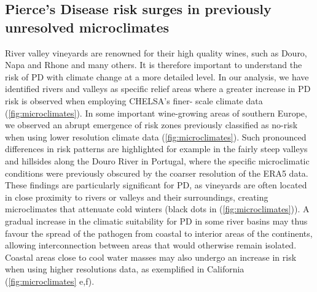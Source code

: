 \subsection{Pierce's Disease risk surges in previously unresolved
    microclimates}

River valley vineyards are renowned  for their high quality wines, such as
Douro, Napa and Rhone and many others. It is therefore important to understand
the risk of  PD with climate change at	a more detailed level. In our analysis,
we have identified rivers and valleys as specific relief areas where a greater
increase in PD risk is observed when employing CHELSA’s finer- scale climate
data (\cref{fig:microclimates}). In some important wine-growing areas of
southern Europe, we observed an abrupt emergence of risk zones previously
classified as no-risk when using lower resolution climate data
(\cref{fig:microclimates}). Such pronounced differences in risk patterns are
highlighted for example in the fairly steep valleys and hillsides along the
Douro River in Portugal, where the specific microclimatic conditions were
previously obscured by the coarser resolution of the ERA5 data. These findings
are particularly significant for PD,  as vineyards are often located in close
proximity to rivers or valleys and their surroundings, creating microclimates
that attenuate cold winters (black dots in (\cref{fig:microclimates})). A
gradual increase in the climatic suitability for PD in some river basins may
thus favour the spread of the pathogen from coastal  to interior areas of the
continents, allowing interconnection between areas that would otherwise remain
isolated. Coastal areas close to cool water masses may also undergo an increase
in risk  when using higher resolutions data, as exemplified in California
(\cref{fig:microclimates} e,f).

